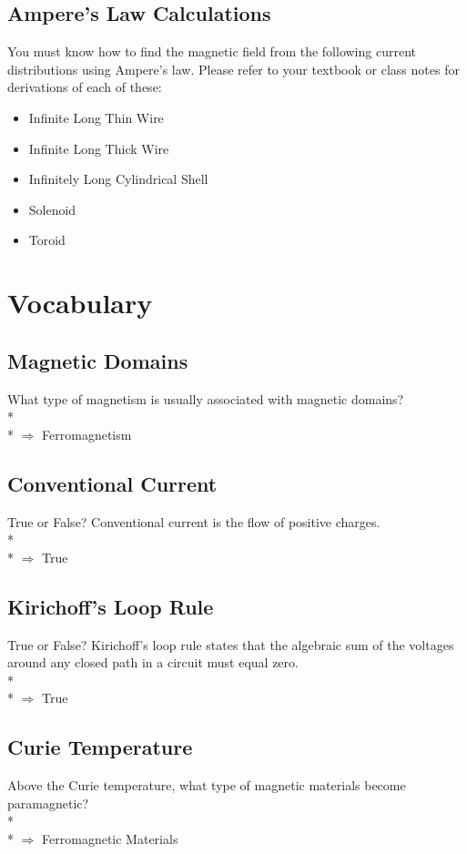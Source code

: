 \documentclass[11pt]{article}
\begin{document}
\subsection{Ampere's Law Calculations}
You must know how to find the magnetic field from the following current distributions using Ampere's law.  Please refer to your textbook or class notes for derivations of each of these:

\begin{itemize}
\item Infinite Long Thin Wire
\item Infinite Long Thick Wire
\item Infinitely Long Cylindrical Shell
\item Solenoid
\item Toroid
\end{itemize}


\pagebreak
\section{Vocabulary}
\vspace{10pt}

\subsection{Magnetic Domains}
What type of magnetism is usually associated with magnetic domains? \\* \\*
$\Rightarrow$ Ferromagnetism

\subsection{Conventional Current}
True or False?  Conventional current is the flow of positive charges. \\* \\*
$\Rightarrow$ True

\subsection{Kirichoff's Loop Rule}
True or False?  Kirichoff's loop rule states that the algebraic sum of the voltages around any closed path in a circuit must equal zero. \\* \\*
$\Rightarrow$ True

\subsection{Curie Temperature}
Above the Curie temperature, what type of magnetic materials become paramagnetic? \\* \\*
$\Rightarrow$ Ferromagnetic Materials

\end{document}
